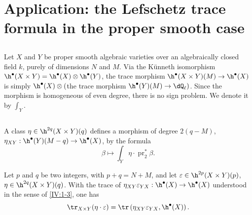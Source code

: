 \documentclass[oneside]{book}
\begin{document}
\section{Application: the Lefschetz trace formula in the proper smooth case}\label{IV:3}






\subsection{}\label{IV:3-1}

Let $X$ and $Y$ be proper smooth algebraic varieties over an algebraically
closed field $k$, purely of dimensions $N$ and $M$. Via the K\"unneth
isomorphism $\h^\bullet(X\times Y)=\h^\bullet(X)\otimes \h^\bullet(Y)$, the
trace morphism $\h^\bullet(X\times Y)(M)\to \h^\bullet(X)$ is simply
$\h^\bullet(X)\otimes ($the trace morphism
$\h^\bullet(Y)(M)\to \dQ_\ell)$. Since the morphism is homogeneous of even
degree, there is no sign problem. We denote it by $\int_Y$.






\subsection{}\label{IV:3-2}

A class $\eta\in \h^{2 q}(X\times Y)(q)$ defines a morphism of degree
$2(q-M)$, $\eta_{XY}:\h^\bullet(Y)(M-q)\to \h^\bullet(X)$, by the formula
\[
  \beta \mapsto \int_Y \eta\cdot \operatorname{pr}_2^\ast \beta \text{.}
\]






\begin{proposition_}\label{IV:3-3}
Let $p$ and $q$ be two integers, with $p+q=N+M$, and let
$\varepsilon\in \h^{2 p}(X\times Y)(p)$,
$\eta\in \h^{2 q}(X\times Y)(q)$. With the trace of
$\eta_{X Y}\varepsilon_{Y X}:\h^\bullet(X)\to \h^\bullet(X)$ understood in
the sense of \ref{IV:1-3}, one has
\[
  \tr_{X\times Y}(\eta\cdot \varepsilon) = \tr\left(\eta_{X Y}\varepsilon_{Y X},\h^\bullet(X)\right) \text{.}
\]
\end{proposition_}
\end{document}
